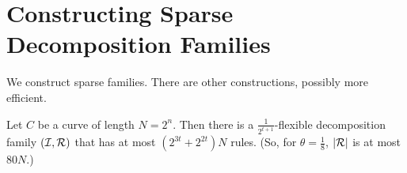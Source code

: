 \documentclass{article}
\begin{document}
\section{Constructing Sparse Decomposition Families}


We construct sparse families. There are other constructions, possibly
more efficient.

\begin{thm}
Let $C$ be a curve of length $N = 2^n$. Then there is a
$\frac{1}{2^{t+1}}$-flexible decomposition family $({\mathcal I},{\mathcal R})$ that
has at most $(2^{3t} + 2^{2t}) N$ rules. (So, for
$\theta=\frac{1}{8}$, $|{\mathcal R}|$ is at most $80 N$.)
\end{thm}
\end{document}
